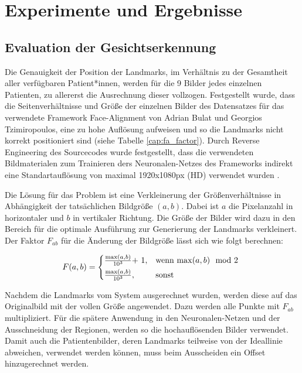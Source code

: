 
\chapter{Experimente und Ergebnisse}\label{experiment}

\section{Evaluation der Gesichtserkennung}\label{evalfa}
Die Genauigkeit der Position der Landmarks, im Verhältnis zu der Gesamtheit aller verfügbaren Patient*innen, werden für die 9 Bilder jedes einzelnen Patienten, zu allererst die Ausrechnung dieser vollzogen. Festgestellt wurde, dass die Seitenverhältnisse und Größe der einzelnen Bilder des Datensatzes für das verwendete Framework \glqq Face-Alignment\grqq{} von Adrian Bulat und Georgios Tzimiropoulos, eine zu hohe Auflösung aufweisen und so die Landmarks nicht korrekt positioniert sind (siehe Tabelle \ref{cap:fa_factor}). Durch Reverse Engineering des Sourcecodes wurde festgestellt, dass die verwendeten Bildmaterialen zum Trainieren ders Neuronalen-Netzes des Frameworks indirekt eine Standartauflösung von maximal 1920x1080px (HD) verwendet wurden \cite{fa_framework}.


Die Lösung für das Problem ist eine Verkleinerung der Größenverhältnisse in Abhängigkeit der tatsächlichen Bildgröße $(a, b)$. Dabei ist $a$ die Pixelanzahl in horizontaler und $b$ in vertikaler Richtung. Die Größe der Bilder wird dazu in den Bereich für die optimale Ausführung zur Generierung der Landmarks verkleinert. Der Faktor $F_{ab}$ für die Änderung der Bildgröße lässt sich wie folgt berechnen:

\begin{equation}
F(a, b) = \begin{cases*}
  \frac{\max(a, b)}{10^{3}} $+ 1$,  & wenn $\max(a, b) \mod 2$  \\
  \frac{\max(a, b)}{10^{3}},        & sonst
\end{cases*}
\end{equation}

Nachdem die Landmarks vom System ausgerechnet wurden, werden diese auf das Originalbild mit der vollen Größe angewendet. Dazu werden alle Punkte mit $F_{ab}$ multipliziert. Für die spätere Anwendung in den Neuronalen-Netzen und der Ausschneidung der Regionen, werden so die hochauflösenden Bilder verwendet. Damit auch die Patientenbilder, deren Landmarks teilweise von der Ideallinie abweichen, verwendet werden können, muss beim Ausscheiden ein Offset hinzugerechnet werden.

